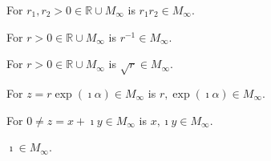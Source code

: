 \begin{lemma}
    \label{lem:construction_mult_pos_real}
    For $r_1, r_2 > 0 \in \mathbb{R}\cup M_{\infty}$ is $r_1 r_2 \in M_{\infty}$.
\end{lemma}

\begin{lemma}
    \label{lem:construction_inv_pos_real}
    For $r > 0\in \mathbb{R}\cup M_{\infty}$ is $r^{-1} \in M_{\infty}$.
\end{lemma}

\begin{lemma}
    \label{lem:construction_sqrt_pos_real}
    For $r > 0 \in \mathbb{R}\cup M_{\infty}$ is $\sqrt{r} \in M_{\infty}$.
\end{lemma}

\begin{lemma}
    \label{lem:construction_polar}
    For $z = r \exp(\imath \alpha) \in M_{\infty}$ is $r, \allowbreak \exp(\imath \alpha) \in M_{\infty}$.
\end{lemma}

\begin{lemma}
    \label{lem:construction_re_im}
    For $0 \ne z = x + \imath y \in M_{\infty}$ is $x, \imath y \in M_{\infty}$.
\end{lemma}

\begin{lemma}
    \label{lem:construction_imath}
    $\imath \in M_{\infty}$.
\end{lemma}
